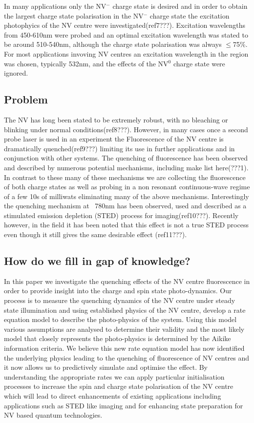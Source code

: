 \documentclass[preprint,prl]{revtex4}
\begin{document}
In many applications only the NV$^-$ charge state is desired and in order to obtain the largest charge state polarisation in the NV$^-$ charge state the excitation photophyics of the NV centre were investigated(ref7???). Excitation wavelengths from 450-610nm were probed and an optimal excitation wavelength was stated to be around 510-540nm, although the charge state polarisation was always $\leq$75\%. For most applications invoving NV centres an excitation wavelength in the region was chosen, typically 532nm, and the effects of the NV$^0$ charge state were ignored.

\subsection{Problem}

The NV has long been stated to be extremely robust, with no bleaching or blinking under normal conditions(ref8???). However, in many cases once a second probe laser is used in an experiment the Fluorescence of the NV centre is dramatically quenched(ref9???) limiting its use in further applications and in conjunction with other systems. The quenching of fluorescence has been observed and described by numerous potential mechanisms, including make list here(???1). In contrast to these many of these mechanisms we are collecting the fluorescence of both charge states as well as probing in a non resonant continuous-wave regime of a few 10s of milliwats eliminating many of the above mechanisms. Interestingly the quenching mechanism at ~780nm has been observed, used and described as a stimulated emission depletion (STED) process for imaging(ref10???). Recently however, in the field it has been noted that this effect is not a true STED process even though it still gives the same desirable effect (ref11???).  

\subsection{How do we fill in gap of knowledge?}

In this paper we investigate the quenching effects of the NV centre fluorescence in order to provide insight into the charge and spin state photo-dynamics. Our process is to measure the quenching dynamics of the NV centre under steady state illumination and using established physics of the NV centre, develop a rate equation model to describe the photo-physics of the system. Using this model various assumptions are analysed to determine their validity and the most likely model that closely represents the photo-physics is determined by the Aikike information criteria. We believe this new rate equation model has now identified the underlying physics leading to the quenching of fluorescence of NV centres and it now allows us to predictively simulate and optimise the effect. By understanding the appropriate rates we can apply particular initialisation processes to increase the spin and charge state polarisation of the NV centre which will lead to direct enhancements of existing applications including applications such as STED like imaging and for enhancing state preparation for NV based quantum technologies.
\end{document}
